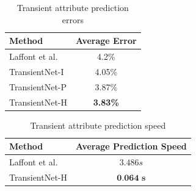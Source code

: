 \documentclass[10pt,twocolumn,letterpaper]{article}
\begin{document}
\begin{table}[t]
	\centering
	\caption{Transient attribute prediction errors}
	\begin{tabular}{ | l | c | }
		\hline
			Method & Average Error \\ \hline \hline
			Laffont et al.~\cite{Laffont14}& 4.2\% \\ \hline
			TransientNet-I & 4.05\% \\ \hline
			TransientNet-P & 3.87\% \\ \hline
			TransientNet-H & \textbf{3.83\%} \\ 
		\hline
	\end{tabular}
	\label{tbl:transient}
\end{table}

\begin{table}[t]
	\centering
	\caption{Transient attribute prediction speed}
	\begin{tabular}{ | l | c | }
		\hline
			Method & Average Prediction Speed \\ \hline \hline
			Laffont et al.~\cite{Laffont14}& $ 3.486 s $ \\ \hline
			TransientNet-H & $ \textbf{0.064 s} $ \\ 
		\hline
	\end{tabular}
	\label{tbl:timing}
\end{table}

\end{document}
